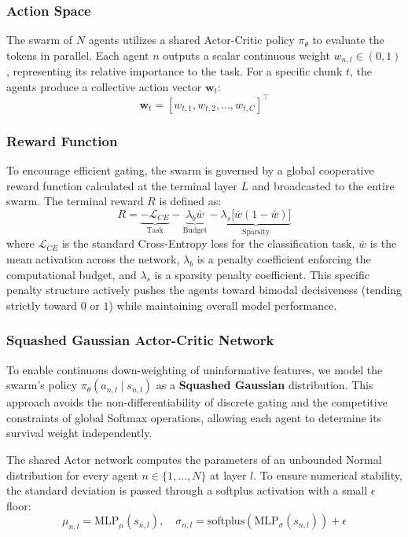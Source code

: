 \subsubsection{Action Space}
The swarm of $N$ agents utilizes a shared Actor-Critic policy $\pi_\theta$ to evaluate the tokens in parallel. Each agent $n$ outputs a scalar continuous weight $w_{n,l} \in (0,1)$, representing its relative importance to the task. For a specific chunk $t$, the agents produce a collective action vector $\mathbf{w}_t$:
\begin{equation}
	\mathbf{w}_t = [w_{t,1}, w_{t,2}, \dots, w_{t,C}]^\top
\end{equation}
\subsubsection{Reward Function}
To encourage efficient gating, the swarm is governed by a global cooperative reward function calculated at the terminal layer $L$ and broadcasted to the entire swarm. The terminal reward $R$ is defined as:
\begin{equation}
	R = \underbrace{-\mathcal{L}_{CE}}_{\text{Task}} - \underbrace{\lambda_b \bar{w}}_{\text{Budget}} - \underbrace{\lambda_s \big[ \bar{w}(1-\bar{w}) \big]}_{\text{Sparsity}}
\end{equation}
where $\mathcal{L}_{CE}$ is the standard Cross-Entropy loss for the classification task, $\bar{w}$ is the mean activation across the network, $\lambda_b$ is a penalty coefficient enforcing the computational budget, and $\lambda_s$ is a sparsity penalty coefficient. This specific penalty structure actively pushes the agents toward bimodal decisiveness (tending strictly toward $0$ or $1$) while maintaining overall model performance.


\subsubsection{Squashed Gaussian Actor-Critic Network}
To enable continuous down-weighting of uninformative features, we model the swarm's policy $\pi_\theta(a_{n,l} \mid s_{n,l})$ as a \textbf{Squashed Gaussian} distribution. This approach avoids the non-differentiability of discrete gating and the competitive constraints of global Softmax operations, allowing each agent to determine its survival weight independently.

The shared Actor network computes the parameters of an unbounded Normal distribution for every agent $n \in \{1, \dots, N\}$ at layer $l$. To ensure numerical stability, the standard deviation is passed through a softplus activation with a small $\epsilon$ floor:
\begin{equation}
	\mu_{n,l} = \mathrm{MLP}_\mu(s_{n,l}), \quad \sigma_{n,l} = \mathrm{softplus}(\mathrm{MLP}_\sigma(s_{n,l})) + \epsilon
\end{equation}

